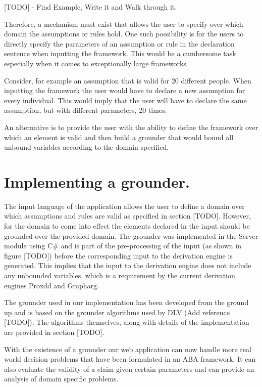 [TODO] - Find Example, Write it and Walk through it.

Therefore, a mechanism must exist that allows the user to specify over which domain the assumptions or rules hold. One such possibility is for the users to directly specify the parameters of an assumption or rule in the declaration sentence when inputting the framework. This would be a cumbersome task especially when it comes to exceptionally large frameworks. 

Consider, for example an assumption that is valid for 20 different people. When inputting the framework the user would have to declare a new assumption for every individual. This would imply that the user will have to declare the same assumption, but with different parameters, 20 times.

An alternative is to provide the user with the ability to define the framework over which an element is valid and then build a grounder that would bound all unbound variables according to the domain specified.

\section{Implementing a grounder.}

The input language of the application allows the user to define a domain over which assumptions and rules are valid as specified in section [TODO]. However, for the domain to come into effect the elements declared in the input should be grounded over the provided domain. The grounder was implemented in the Server module using C\# and is part of the pre-processing of the input (as shown in figure [TODO]) before the corresponding input to the derivation engine is generated. This implies that the input to the derivation engine does not include any unbounded variables, which is a requirement by the current derivation engines Proxdd and Grapharg.

The grounder used in our implementation has been developed from the ground up and is based on the grounder algorithms used by DLV (Add reference [TODO]). The algorithms themselves, along with details of the implementation are provided in section [TODO].

With the existence of a grounder our web application can now handle more real world decision problems that have been formulated in an ABA framework. It can also evaluate the validity of a claim given certain parameters and can provide an analysis of domain specific problems.

